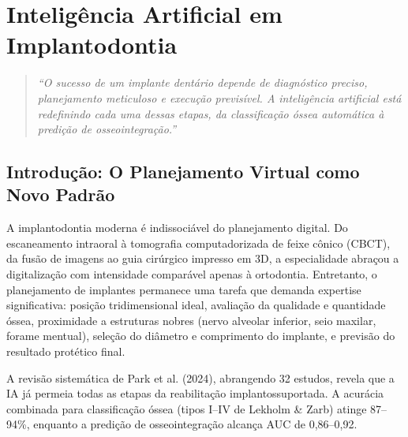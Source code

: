 \chapter{Inteligência Artificial em Implantodontia}
\label{cap:implantodontia-ia}
\niveltres

\begin{quote}
\textit{``O sucesso de um implante dentário depende de diagnóstico preciso, planejamento meticuloso e execução previsível. A inteligência artificial está redefinindo cada uma dessas etapas, da classificação óssea automática à predição de osseointegração.''}
\end{quote}

\section{Introdução: O Planejamento Virtual como Novo Padrão}

A implantodontia moderna é indissociável do planejamento digital. Do escaneamento intraoral à tomografia computadorizada de feixe cônico (CBCT), da fusão de imagens ao guia cirúrgico impresso em 3D, a especialidade abraçou a digitalização com intensidade comparável apenas à ortodontia. Entretanto, o planejamento de implantes permanece uma tarefa que demanda expertise significativa: posição tridimensional ideal, avaliação da qualidade e quantidade óssea, proximidade a estruturas nobres (nervo alveolar inferior, seio maxilar, forame mentual), seleção do diâmetro e comprimento do implante, e previsão do resultado protético final.

A revisão sistemática de Park et al. (2024), abrangendo 32 estudos, revela que a IA já permeia todas as etapas da reabilitação implantossuportada. A acurácia combinada para classificação óssea (tipos I--IV de Lekholm \& Zarb) atinge 87--94\%, enquanto a predição de osseointegração alcança AUC de 0,86--0,92.


